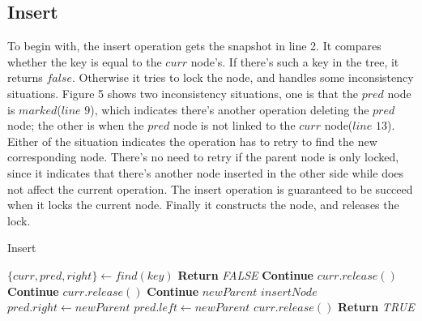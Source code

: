 \documentclass{article}
\begin{document}
\subsection{Insert}
To begin with, the insert operation gets the snapshot in line 2. It compares whether the key is equal to the $curr$ node's. If there's such a key in the tree, it returns $false$. Otherwise it tries to lock the node, and handles some inconsistency situations. Figure 5 shows two inconsistency situations, one is that the $pred$ node is $marked$($line$ $9$), which indicates there's another operation deleting the $pred$ node; the other is when the $pred$ node is not linked to the $curr$ node($line$ $13$). Either of the situation indicates the operation has to retry to find the new corresponding node. There's no need to retry if the parent node is only locked, since it indicates that there's another node inserted in the other side while does not affect the current operation. The insert operation is guaranteed to be succeed when it locks the current node. Finally it constructs the node, and releases the lock.
\begin{algorithm}
\caption{Insert}
\begin{algorithmic}[1]
        \State $\{curr, pred, right\} \gets find(key)$
            \State \textbf{Return} \textit{FALSE}
        \EndIf
            \State \textbf{Continue}
        \EndIf
            \State $curr.release()$
            \State \textbf{Continue}
        \EndIf
            \State $curr.release()$
            \State \textbf{Continue}
        \EndIf
        \State {} $newParent$  $insertNode$
            \State $pred.right \gets newParent$
        \Else
            \State $pred.left \gets newParent$
        \EndIf
        \State $curr.release()$
        \State \textbf{Return} \textit{TRUE}
    \EndWhile
\end{algorithmic}
\end{algorithm}
\end{document}
